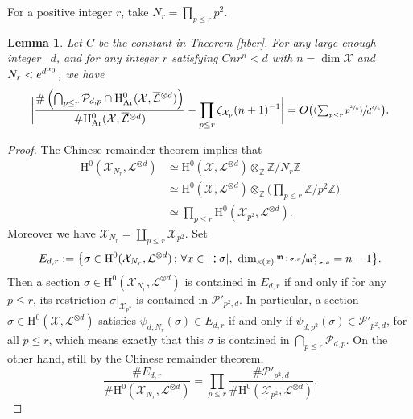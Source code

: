 \documentclass[JEP,XML,SOM,Unicode,published]{cedram}
\newcommand{\psfrac}[2]{\sfrac{(#1)}{#2}}
\newcommand{\sep}{\,;\,}
\theoremstyle{plain}
\newtheorem{lem}[thm]{Lemma}
\theoremstyle{definition}
\newcommand{\ho}{\mathrm{H}}
\newcommand{\m}{\mathfrak{m}}
\newcommand{\X}{\mathcal{X}}
\newcommand{\li}{\mathcal{L}}
\begin{document}
For a positive integer $r$, take $N_r=\prod_{p\leq r}p^2$.
\begin{lem}\label{many}
Let $C$ be the constant in Theorem \ref{fiber}. For any large enough integer~ $d$, and for any integer $r$ satisfying $Cnr^n<d$ with $n=\dim \X$ and $N_r<\nobreak e^{d^{\alpha_0}}$, we have
\[
\biggl| \frac{\#\left(\bigcap_{p\leq r}\mathcal{P}_{d,p}\cap \ho^0_{\mathrm{Ar}}(\X, \overline{\mathcal{L}}{}^{\otimes d})\right)}{\#\ho^0_{\mathrm{Ar}}(\X, \overline{\mathcal{L}}{}^{\otimes d})} -\prod_{p\leq r}\zeta_{\X_p}(n+1)^{-1} \biggr| =O\bigl(\psfrac{\textstyle\sum_{p\leq r}p^{\sfrac{2}{n}}}{d^{\sfrac{2}{n}}} \bigr).
\]
\end{lem}
\begin{proof}
The Chinese remainder theorem implies that
\begin{align*}
\ho^0(\X_{N_r}, \li^{\otimes d}) &\simeq  \ho^0(\X, \li^{\otimes d})\otimes_{\mathbb{Z}}\mathbb{Z}/N_r\mathbb{Z} \\
&\simeq \ho^0(\X, \li^{\otimes d})\otimes_{\mathbb{Z}}\biggl(\prod_{p\leq r}\mathbb{Z}/p^2\mathbb{Z}\biggr)\\
&\simeq \prod_{p\leq r}\ho^0(\X_{p^2}, \li^{\otimes d}).
\end{align*}
Moreover we have $\X_{N_r}=\coprod_{p\leq r}\X_{p^2}$. Set
\[
E_{d,r}:=\bigl\{ \sigma\in \ho^0(\X_{N_r}, \li^{\otimes d})\sep \forall x\in |{\div\sigma}|,\ \dim_{\kappa(x)}\sfrac{\m_{\div \sigma,x}}{\m^2_{\div \sigma, x}}=n-1 \bigr\}.
\]
Then a section $\sigma\in \ho^0(\X_{N_r}, \li^{\otimes d})$ is contained in $E_{d,r}$ if and only if for any $p\leq r$, its restriction $\sigma|_{\X_{p^2}}$ is contained in $\mathcal{P}'_{p^2,d}$. In particular, a section $\sigma \in \ho^0(\X, \li^{\otimes d})$ satisfies $\psi_{d,N_r}(\sigma)\in E_{d,r}$ if and only if $\psi_{d,p^2}(\sigma)\in \mathcal{P}'_{p^2,d}$, for all $p\leq r$, which means exactly that this $\sigma$ is contained in $ \bigcap_{p\leq r}\mathcal{P}_{d,p}$. On the other hand, still by the Chinese remainder theorem,
\[
\frac{\#E_{d,r}}{\#\ho^0(\X_{N_r}, \li^{\otimes d})}=\prod_{p\leq r} \frac{\#\mathcal{P}'_{p^2,d}}{\#\ho^0(\X_{p^2}, \li^{\otimes d})}.
\]


\end{proof}
\end{document}

